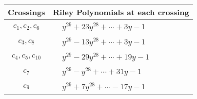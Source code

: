 \documentclass[1p]{elsarticle_modified}
\theoremstyle{definition}
\begin{document}
\begin{tabular}{m{50pt}|m{274pt}}
Crossings & \hspace{64pt}Riley Polynomials at each crossing \\
\hline $$\begin{aligned}c_{1},c_{2},c_{6}\end{aligned}$$&$\begin{aligned}
&y^{29}+23 y^{28}+\cdots+3 y-1
\end{aligned}$\\
\hline $$\begin{aligned}c_{3},c_{8}\end{aligned}$$&$\begin{aligned}
&y^{29}-13 y^{28}+\cdots+3 y-1
\end{aligned}$\\
\hline $$\begin{aligned}c_{4},c_{5},c_{10}\end{aligned}$$&$\begin{aligned}
&y^{29}-29 y^{28}+\cdots+19 y-1
\end{aligned}$\\
\hline $$\begin{aligned}c_{7}\end{aligned}$$&$\begin{aligned}
&y^{29}- y^{28}+\cdots+31 y-1
\end{aligned}$\\
\hline $$\begin{aligned}c_{9}\end{aligned}$$&$\begin{aligned}
&y^{29}+7 y^{28}+\cdots-17 y-1
\end{aligned}$\\
\hline
\end{tabular}
\vskip 2pc
\end{document}
